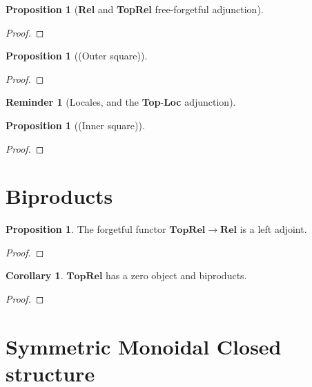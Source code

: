 \documentclass{tufte-handout}
\theoremstyle{definition}
\newtheorem{corollary}[theorem]{Corollary}
\newtheorem{proposition}[theorem]{Proposition}
\newtheorem{rem}[theorem]{Reminder}
\begin{document}
\begin{proposition}[\textbf{Rel} and \textbf{TopRel} free-forgetful adjunction]

\begin{proof}

\end{proof}
\end{proposition}


\begin{proposition}[(Outer square)]

\begin{proof}

\end{proof}
\end{proposition}

\begin{rem}[Locales, and the \textbf{Top}-\textbf{Loc} adjunction]

\end{rem}

\begin{proposition}[(Inner square)]

\begin{proof}

\end{proof}
\end{proposition}






\section{Biproducts}

\begin{proposition}
The forgetful functor $\mathbf{TopRel} \rightarrow \mathbf{Rel}$ is a left adjoint.
\begin{proof}

\end{proof}
\end{proposition}

\begin{corollary}
$\mathbf{TopRel}$ has a zero object and biproducts.
\begin{proof}

\end{proof}
\end{corollary}

\section{Symmetric Monoidal Closed structure}
\end{document}
